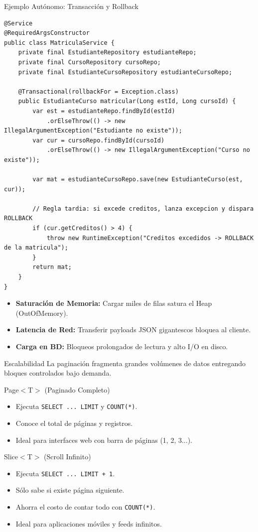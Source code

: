 \documentclass[aspectratio=169]{beamer}
\begin{document}
\begin{frame}[fragile]{Ejemplo Aut\'onomo: Transacci\'on y Rollback}
\begin{lstlisting}[style=SpringCodeStyle]
@Service
@RequiredArgsConstructor
public class MatriculaService {
    private final EstudianteRepository estudianteRepo;
    private final CursoRepository cursoRepo;
    private final EstudianteCursoRepository estudianteCursoRepo;

    @Transactional(rollbackFor = Exception.class)
    public EstudianteCurso matricular(Long estId, Long cursoId) {
        var est = estudianteRepo.findById(estId)
            .orElseThrow(() -> new IllegalArgumentException("Estudiante no existe"));
        var cur = cursoRepo.findById(cursoId)
            .orElseThrow(() -> new IllegalArgumentException("Curso no existe"));

        var mat = estudianteCursoRepo.save(new EstudianteCurso(est, cur));

        // Regla tardia: si excede creditos, lanza excepcion y dispara ROLLBACK
        if (cur.getCreditos() > 4) {
            throw new RuntimeException("Creditos excedidos -> ROLLBACK de la matricula");
        }
        return mat;
    }
}
\end{lstlisting}
\end{frame}

  {
    \begin{itemize}
      \item \textbf{Saturaci\'on de Memoria:} Cargar miles de filas satura el Heap (OutOfMemory).
      \item \textbf{Latencia de Red:} Transferir payloads JSON gigantescos bloquea al cliente.
      \item \textbf{Carga en BD:} Bloqueos prolongados de lectura y alto I/O en disco.
    \end{itemize}
  }
  {Escalabilidad}
  {La paginaci\'on fragmenta grandes vol\'umenes de datos entregando bloques controlados bajo demanda.}

  {Page$<$T$>$ (Paginado Completo)}
  {
    \begin{itemize}
      \item Ejecuta \texttt{SELECT ... LIMIT} y \texttt{COUNT(*)}.
      \item Conoce el total de p\'aginas y registros.
      \item Ideal para interfaces web con barra de p\'aginas (1, 2, 3...).
    \end{itemize}
  }
  {Slice$<$T$>$ (Scroll Infinito)}
  {
    \begin{itemize}
      \item Ejecuta \texttt{SELECT ... LIMIT + 1}.
      \item S\'olo sabe si existe p\'agina siguiente.
      \item Ahorra el costo de contar todo con \texttt{COUNT(*)}.
      \item Ideal para aplicaciones m\'oviles y feeds infinitos.
    \end{itemize}
  }
\end{document}

